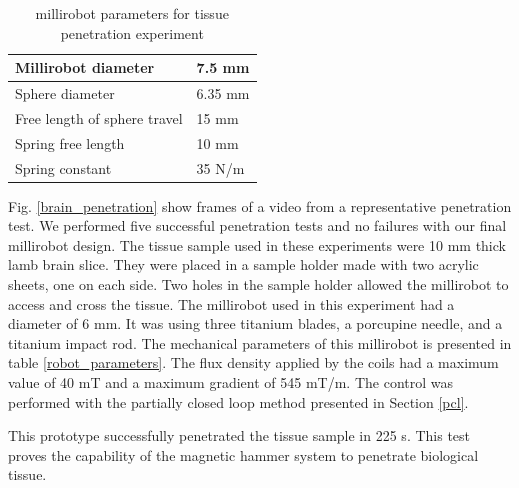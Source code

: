 \documentclass[letterpaper, 10 pt, conference]{ieeeconf}  %
\begin{document}
\begin{table}[]
\centering
\caption{millirobot parameters for  tissue penetration experiment}
\label{my-label}
\begin{tabular}{|l|l|}
\hline
Millirobot diameter          & 7.5 mm  \\ \hline
Sphere diameter              & 6.35 mm \\ \hline
Free length of sphere travel & 15 mm   \\ \hline
Spring free length           & 10 mm   \\ \hline
Spring constant              & 35 N/m  \\ \hline
\end{tabular}
\end{table}



Fig. \ref{brain_penetration} show frames of a video from a representative penetration test. We performed five successful penetration tests and no failures with our final millirobot design.
The tissue sample used in these experiments were 10 mm thick lamb brain slice. They were placed in a sample holder made with two acrylic sheets, one on each side. Two holes in the sample holder allowed the millirobot to access and cross the tissue. The millirobot used in this experiment had a diameter of 6 mm. It was using three titanium blades, a porcupine needle, and a titanium impact rod. The mechanical parameters of this millirobot is presented in table \ref{robot_parameters}. The flux density applied by the coils had a maximum value of 40 mT and a maximum gradient of 545 mT/m. The control was performed with the partially closed loop method presented in Section \ref{pcl}.\par
This prototype successfully penetrated the tissue sample in 225 s. This test proves the capability of the magnetic hammer system to penetrate biological tissue.
\end{document}
